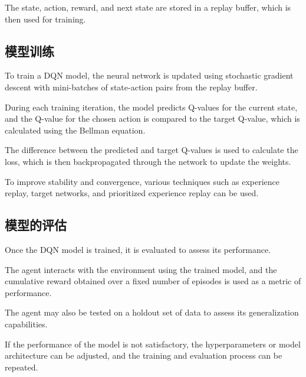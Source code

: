 The state, action, reward, and next state are stored in a replay buffer, which is then used for training.

\subsection{模型训练}

To train a DQN model, the neural network is updated using stochastic gradient descent with mini-batches of state-action pairs from the replay buffer.

During each training iteration, the model predicts Q-values for the current state, and the Q-value for the chosen action is compared to the target Q-value, which is calculated using the Bellman equation.

The difference between the predicted and target Q-values is used to calculate the loss, which is then backpropagated through the network to update the weights.

To improve stability and convergence, various techniques such as experience replay, target networks, and prioritized experience replay can be used.

\subsection{模型的评估}

Once the DQN model is trained, it is evaluated to assess its performance.

The agent interacts with the environment using the trained model, and the cumulative reward obtained over a fixed number of episodes is used as a metric of performance.

The agent may also be tested on a holdout set of data to assess its generalization capabilities.

If the performance of the model is not satisfactory, the hyperparameters or model architecture can be adjusted, and the training and evaluation process can be repeated.